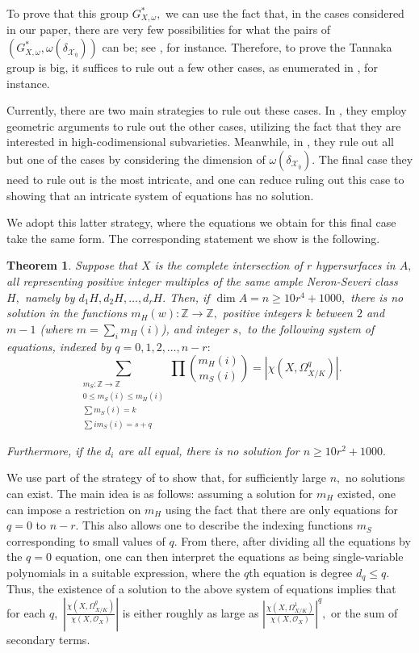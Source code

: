 \documentclass{article}
\newtheorem{thm}{Theorem}[section]
\theoremstyle{definition}
\theoremstyle{remark}
\begin{document}
\par To prove that this group $G^*_{X, \omega},$ we can use the fact that, in the cases considered in our paper, there are very few possibilities for what the pairs of $(G_{X, \omega}^*, \omega(\delta_{\mathcal{X}_{\overline{\eta}}}))$ can be; see \cite[Theorem 6.1]{jklm23}, for instance. Therefore, to prove the Tannaka group is big, it suffices to rule out a few other cases, as enumerated in \cite[Theorem 5.1.5]{Green_2013}, for instance.
\par Currently, there are two main strategies to rule out these cases. In \cite{jklm23}, they employ geometric arguments to rule out the other cases, utilizing the fact that they are interested in high-codimensional subvarieties. Meanwhile, in \cite{ls25}, they rule out all but one of the cases by considering the dimension of $\omega(\delta_{\mathcal{X}_{\overline{\eta}}}).$ The final case they need to rule out is the most intricate, and one can reduce ruling out this case to showing that an intricate system of equations has no solution.
\par We adopt this latter strategy, where the equations we obtain for this final case take the same form. The corresponding statement we show is the following.
\begin{thm}\label{thm: big monodromy statement intro version}
Suppose that $X$ is the complete intersection of $r$ hypersurfaces in $A,$ all representing positive integer multiples of the same ample Neron-Severi class $H,$ namely by $d_1H, d_2H, \ldots, d_rH.$ Then, if $\dim A = n \geq 10r^4 + 1000,$ there is no solution in the functions $m_H(w): \mathbb{Z} \rightarrow \mathbb{Z},$ positive integers $k$ between $2$ and $m - 1$ (where $m = \sum\limits_i m_H(i)$), and integer $s,$ to the following system of equations, indexed by $q = 0, 1, 2, \ldots, n-r:$
\[\sum\limits_{\substack{m_S: \mathbb{Z} \rightarrow \mathbb{Z} \\ 0 \leq m_S(i) \leq m_H(i) \\ \sum m_S(i) = k \\ \sum im_S(i) = s + q}} \prod\limits \binom{m_H(i)}{m_S(i)} = |\chi(X, \Omega^q_{X/K})|.\]
\par Furthermore, if the $d_i$ are all equal, there is no solution for $n \geq 10r^2 + 1000.$
\end{thm}
\par We use part of the strategy of \cite[Appendix B]{ls25} to show that, for sufficiently large $n,$ no solutions can exist. The main idea is as follows: assuming a solution for $m_H$ existed, one can impose a restriction on $m_H$ using the fact that there are only equations for $q = 0$ to $n-r.$ This also allows one to describe the indexing functions $m_S$ corresponding to small values of $q.$ From there, after dividing all the equations by the $q = 0$ equation, one can then interpret the equations as being single-variable polynomials in a suitable expression, where the $q$th equation is degree $d_q \leq q.$ Thus, the existence of a solution to the above system of equations implies that for each $q,$ $\left|\frac{\chi(X, \Omega^q_{X/K})}{\chi(X, \mathcal{O}_X)}\right|$ is either roughly as large as $\left|\frac{\chi(X, \Omega^1_{X/K})}{\chi(X, \mathcal{O}_X)}\right|^q,$ or the sum of secondary terms.
\end{document}
